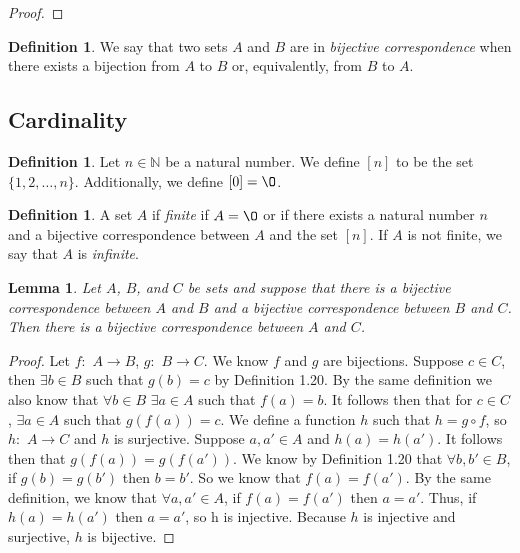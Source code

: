 \documentclass[12pt]{article}
\renewcommand{\emptyset}{\O}
\newtheorem{lemma}[theorem]{Lemma}
\theoremstyle{definition}
\newtheorem{definition}[theorem]{Definition}
\numberwithin{equation}{subsection}
\begin{document}
{\begin {proof}
\end {proof}


\begin{definition}
We say that two sets $A$ and $B$ are in \emph{bijective correspondence} when there exists a bijection from $A$ to $B$ or, equivalently, from $B$ to $A$.
\end{definition}



\subsection*{Cardinality}

\begin{definition}  
Let $n \in \mathbb{N}$ be a natural number.  We define $[n]$ to be the set $\{1, 2, \dotsc, n \}$.  
Additionally, we define $[0]=\emptyset$.
\end{definition}

\begin{definition}  
A set $A$ if \emph{finite} if $A=\emptyset$ or if there exists a natural number $n$ and a bijective correspondence between $A$ and the set $[n]$.  If $A$ is not finite, we say that $A$ is \emph{infinite}.
\end{definition}

\begin{lemma}  Let $A$, $B$, and $C$ be sets and suppose that there is a bijective correspondence between $A$ and $B$ and a bijective correspondence between $B$ and $C$.  Then there is a bijective correspondence between $A$ and $C$.
\end{lemma}
\begin{proof}
Let $f: $ $A \to B$, $g: $ $B \to C$. We know $f$ and $g$ are bijections. Suppose $c \in C$, then $\exists b \in B$ such that $g(b) = c$ by Definition 1.20. By the same definition we also know that $\forall b  \in B$ $\exists a \in A$ such that $f(a) = b$. It follows then that for $c \in C$, $\exists a \in A$ such that $g(f(a)) = c$. We define a function $h$ such that $h = g \circ f$, so $h: $ $A \to C$ and $h$ is surjective.
Suppose $a, a' \in A$ and $h(a) = h(a')$. It follows then that $g(f(a)) = g(f(a'))$. We know by Definition 1.20 that $\forall b, b' \in B$, if $g(b) = g(b')$ then $b = b'$. So we know that $f(a) = f(a')$. By the same definition, we know that $\forall a, a' \in A$, if $f(a) = f(a')$ then $a = a'$. Thus, if $h(a) = h(a')$ then $a = a'$, so h is injective. Because $h$ is injective and surjective, $h$ is bijective.
\end{proof}

}
\end{document}
